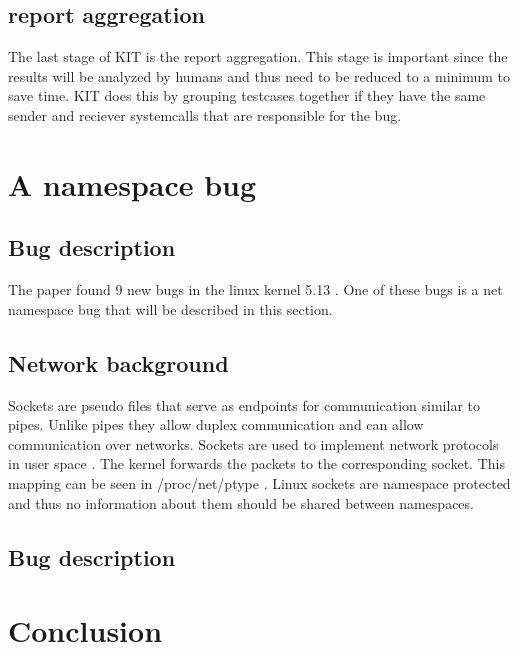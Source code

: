 \documentclass[10pt,twocolumn,a4paper]{article}
\begin{document}
\subsection{report aggregation}
The last stage of KIT is the report aggregation. This stage is important since the results will be
analyzed by humans and thus need to be reduced to a minimum to save time. KIT does this by grouping
testcases together if they have the same sender and reciever systemcalls that are responsible for
the bug. 
\section{A namespace bug}\label{sec:bug}
\subsection{Bug description}
The paper found 9 new bugs in the linux kernel 5.13 \cite{0}. One of these bugs is a net namespace
bug that will be described in this section. 

\subsection{Network background}
Sockets are pseudo files that serve as endpoints for communication similar to pipes. Unlike pipes
they allow duplex communication and can allow communication over networks\cite{5}. Sockets are
used to implement network protocols in user space \cite{5}. The kernel forwards the packets to the
corresponding socket. This mapping can be seen in /proc/net/ptype \cite{6}. Linux sockets are
namespace protected and thus no information about them should be shared between namespaces.

\subsection{Bug description}


\section{Conclusion}\label{sec:conclusion}



\end{document}
